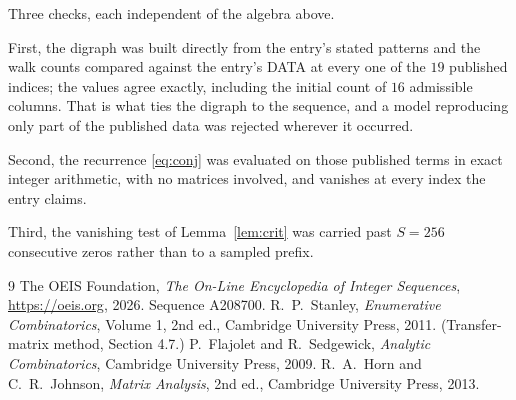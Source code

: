 \documentclass[11pt,a4paper]{article}
\theoremstyle{plain}
\theoremstyle{definition}
\begin{document}
Three checks, each independent of the algebra above.

First, the digraph was built directly from the entry's stated patterns and the walk counts
compared against the entry's DATA at every one of the $19$ published indices; the
values agree exactly, including the initial count of $16$ admissible columns. That is
what ties the digraph to the sequence, and a model reproducing only part of the published
data was rejected wherever it occurred.

Second, the recurrence \eqref{eq:conj} was evaluated on those published terms in exact
integer arithmetic, with no matrices involved, and vanishes at every index the entry claims.

Third, the vanishing test of Lemma~\ref{lem:crit} was carried past $S=256$ consecutive
zeros rather than to a sampled prefix.

\begin{thebibliography}{9}
 The OEIS Foundation, \emph{The On-Line Encyclopedia of Integer
Sequences}, \url{https://oeis.org}, 2026. Sequence A208700.
 R.~P.~Stanley, \emph{Enumerative Combinatorics}, Volume 1, 2nd ed.,
Cambridge University Press, 2011. (Transfer-matrix method, Section 4.7.)
 P.~Flajolet and R.~Sedgewick, \emph{Analytic Combinatorics}, Cambridge
University Press, 2009.
 R.~A.~Horn and C.~R.~Johnson, \emph{Matrix Analysis}, 2nd ed., Cambridge
University Press, 2013.
\end{thebibliography}
\end{document}
